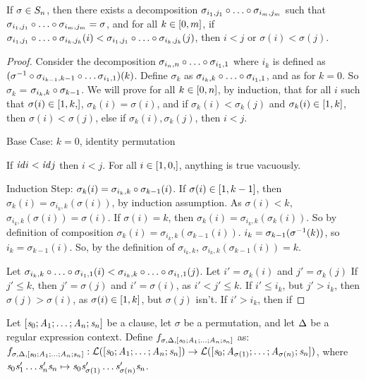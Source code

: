 \begin{lemma}
If $\sigma\in S_{n}$, then there exists a decomposition
$\sigma_{i_1,j_1}\circ\ldots\circ\sigma_{i_m,j_m}$ such that
$\sigma_{i_1,j_1}\circ\ldots\circ\sigma_{i_m,j_m}=\sigma$,
and for all $k\in[0,m]$,
if $\sigma_{i_1,j_1}\circ\ldots\circ\sigma_{i_k,j_k}(i)<
\sigma_{i_1,j_1}\circ\ldots\circ\sigma_{i_k,j_k}(j)$,
then $i<j$ or $\sigma(i)<\sigma(j)$.
\begin{proof}
Consider the decomposition $\sigma_{i_n,n}\circ\ldots\circ\sigma_{i_1,1}$ where $i_k$ is defined as
$(\sigma^{-1}\circ\sigma_{i_{k-1},k-1}\circ\ldots\sigma_{i_1,1})(k)$.
Define $\sigma_k$ as $\sigma_{i_k,k}\circ\ldots\circ\sigma_{i_1,1}$, and as \Identity{} for $k=0$.
So $\sigma_k$ = $\sigma_{i_k,k}\circ\sigma_{k-1}$.
We will prove for all $k\in[0,n]$, by induction, that
for all $i$ such that $\sigma(i)\in\RangeIncInc{1,k}$, $\sigma_k(i)=\sigma(i)$,
and if
$\sigma_k(i)<\sigma_k(j)$
and $\sigma_k(i)\in[1,k]$, then $\sigma(i)<\sigma(j)$,
else if $\sigma_k(i),\sigma_k(j)$, then $i<j$.

Base Case: $k=0$, identity permutation

If $\mathit{id} i<\mathit{id} j$ then $i < j$.  For all $i\in\RangeIncInc{1,0}$, anything is true vacuously.

Induction Step:
$\sigma_k(i)=\sigma_{i_k,k}\circ\sigma_{k-1}(i)$.
If $\sigma(i)\in[1,k-1]$, then $\sigma_k(i)=\sigma_{i_k,k}(\sigma(i))$, by induction assumption.
As $\sigma(i)<k$, $\sigma_{i_k,k}(\sigma(i))=\sigma(i)$.
If $\sigma(i)=k$, then $\sigma_k(i)=\sigma_{i_k,k}(\sigma_k(i))$.
So by definition of composition $\sigma_k(i)=\sigma_{i_k,k}(\sigma_{k-1}(i))$.
$i_k=\sigma_{k-1}(\sigma^{-1}(k))$, so $i_k=\sigma_{k-1}(i)$.
So, by the definition of $\sigma_{i_k,k}$, $\sigma_{i_k,k}(\sigma_{k-1}(i))=k$.

Let $\sigma_{i_k,k}\circ\ldots\circ\sigma_{i_1,1}(i) < \sigma_{i_k,k}\circ\ldots\circ\sigma_{i_1,1}(j)$.
Let $i'=\sigma_k(i)$
and $j'=\sigma_k(j)$
If $j'\leq k$, then $j'=\sigma(j)$ and $i'=\sigma(i)$, as $i'<j'\leq k$.
If $i'\leq i_k$, but $j'>i_k$, then $\sigma(j)>\sigma(i)$, as $\sigma(i)\in[1,k]$,
but $\sigma(j)$ isn't.
If $i' > i_k$, then if 
\end{proof}
\end{lemma}

\begin{definition}
Let $[\mathit{s}_0;\mathit{A}_1;\ldots;\mathit{A}_n;\mathit{s}_n]$ be a clause, let $\sigma$ be a permutation, and let $\Delta$ be a regular expression context.
Define
$f_{\sigma,\Delta,[\mathit{s}_0;\mathit{A}_1;\ldots;\mathit{A}_n;\mathit{s}_n]}$ as:
$f_{\sigma,\Delta,[\mathit{s}_0;\mathit{A}_1;\ldots;\mathit{A}_n;\mathit{s}_n]}: \mathcal{L}([\mathit{s}_0;\mathit{A}_1;\ldots;\mathit{A}_n;\mathit{s}_n])\rightarrow\mathcal{L}([\mathit{s}_0;\mathit{A}_{\sigma(1)};\ldots;\mathit{A}_{\sigma(n)};\mathit{s}_n])$, where $\mathit{s}_0\mathit{s}_1'\ldots\mathit{s}_n'\mathit{s}_n\mapsto\mathit{s}_0\mathit{s}_{\sigma(1)}'\ldots\mathit{s}_{\sigma(n)}'\mathit{s}_n$.
\end{definition}


